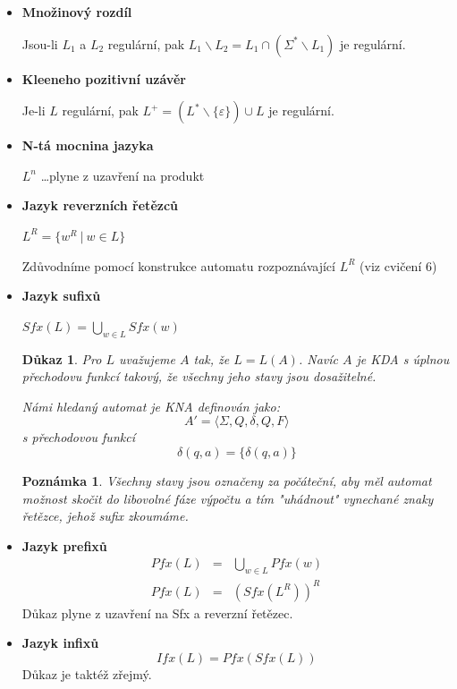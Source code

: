 \documentclass[10pt, a4paper, titlepage]{article}
\theoremstyle{note}
\newtheorem{dukaz}{\textbf{Důkaz}}
\newtheorem{poznamka}{\textbf{Poznámka}}
\begin{document}
\begin{itemize}

\item
\textbf{Množinový rozdíl}

Jsou-li $L_1$ a $L_2$ regulární, pak $L_1 \backslash L_2 = L_1 \cap (\Sigma^* \backslash L_1)$ je regulární.

\item
\textbf{Kleeneho pozitivní uzávěr}

Je-li $L$ regulární, pak $L^+ = (L^* \backslash \lbrace \varepsilon \rbrace) \cup L$ je regulární.

\item
\textbf{N-tá mocnina jazyka}

$L^n$ \ldots plyne z uzavření na produkt

\item
\textbf{Jazyk reverzních řetězců}

$L^R = \lbrace w^R \ |\ w \in L \rbrace$

Zdůvodníme pomocí konstrukce automatu rozpoznávající $L^R$ (viz cvičení 6) 

\item
\textbf{Jazyk sufixů}

$Sfx(L) = \bigcup_{w \in L} Sfx(w)$

\begin{dukaz}
Pro $L$ uvažujeme $A$ tak, že $L = L(A)$. Navíc $A$ je KDA s úplnou přechodovu funkcí takový, že všechny jeho stavy jsou dosažitelné.

Námi hledaný automat je KNA definován jako:
$$A' = \langle \Sigma,Q,\delta,Q,F \rangle$$
s přechodovou funkcí
$$\delta(q,a) = \lbrace \delta(q,a) \rbrace$$
\end{dukaz}
\begin{poznamka}
Všechny stavy jsou označeny za počáteční, aby měl automat možnost skočit do libovolné fáze výpočtu a tím "uhádnout" vynechané znaky řetězce, jehož sufix zkoumáme.
\end{poznamka}

\item
\textbf{Jazyk prefixů}
\begin{eqnarray*}
Pfx(L) &=& \bigcup_{w \in L} Pfx(w) \\
Pfx(L) &=& (Sfx(L^R))^R
\end{eqnarray*}
Důkaz plyne z uzavření na Sfx a reverzní řetězec.

\item
\textbf{Jazyk infixů}
$$
Ifx(L) = Pfx(Sfx(L))
$$
Důkaz je taktéž zřejmý.
\end{itemize}
\end{document}
